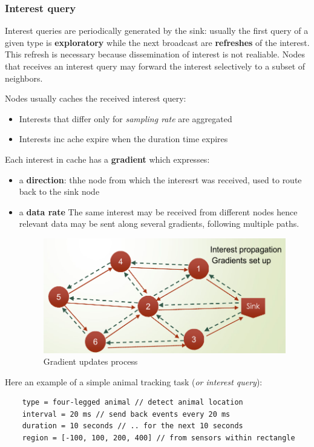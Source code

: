 \documentclass[10pt,a4paper]{report}
\theoremstyle{definition}
\begin{document}
\subsubsection{Interest query}\label{sec:interest-query}
Interest queries are periodically generated by the sink: usually the first query of a given type is \textbf{exploratory} while the next broadcast are \textbf{refreshes} of the interest. This refresh is necessary because dissemination of interest is not realiable.
Nodes that receives an interest query may forward  the interest selectively to a subset of neighbors.

Nodes usually caches the received interest query:
\begin{itemize}
	\item 
	Interests that differ only for \textit{sampling rate} are aggregated
	\item 
	Interests inc ache expire when the duration time expires
\end{itemize}
Each interest in cache has a \textbf{gradient} which expresses:
\begin{itemize}
	\item 
	a \textbf{direction}: thhe node from which the interesrt was received, used to route back to the sink node
	\item 
	a \textbf{data rate}
	The same interest may be received from different nodes hence relevant data may be sent along several gradients, following multiple paths.
	\begin{figure}[h]
		\centering\includegraphics[scale=0.50]{images/Pasted image 20230522171354.png}
		\caption{Gradient updates process}
	\end{figure}
	
\end{itemize}

Here an example of a simple animal tracking task (\textit{or interest query}):
\begin{verbatim}
	type = four-legged animal // detect animal location
	interval = 20 ms // send back events every 20 ms
	duration = 10 seconds // .. for the next 10 seconds
	region = [-100, 100, 200, 400] // from sensors within rectangle
\end{verbatim}
\end{document}
